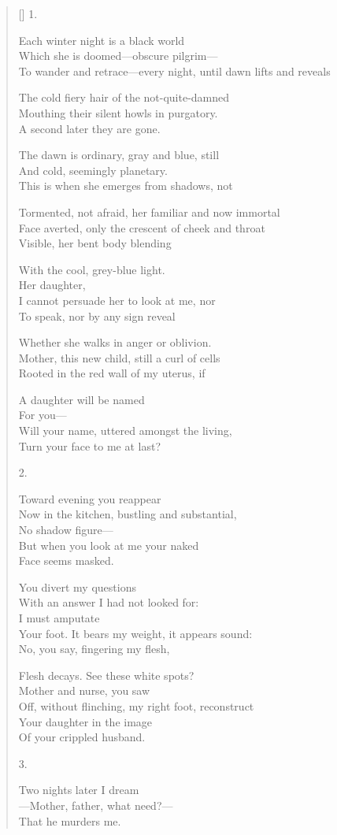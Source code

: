 \settowidth{\versewidth}{To wander and retrace---every night, until dawn lifts and reveals}
\begin{verse}[\versewidth]
1.

Each winter night is a black world\\
Which she is doomed---obscure pilgrim---\\
To wander and retrace---every night, until dawn lifts and reveals

The cold fiery hair of the not-quite-damned\\
Mouthing their silent howls in purgatory.\\
	A second later they are gone.

The dawn is ordinary, gray and blue, still\\
And cold, seemingly planetary.\\
This is when she emerges from shadows, not 

Tormented, not afraid, her familiar and now immortal\\
Face averted, only the crescent of cheek and throat\\
Visible, her bent body blending

With the cool, grey-blue light.\\
\hfill Her daughter,\\
I cannot persuade her to look at me, nor\\
To speak, nor by any sign reveal

Whether she walks in anger or oblivion.\\
Mother, this new child, still a curl of cells\\
Rooted in the red wall of my uterus, if

A daughter will be named\\
For you---\\
\hfill Will your name, uttered amongst the living,\\
Turn your face to me at last?

2.

Toward evening you reappear\\
Now in the kitchen, bustling and substantial,\\
No shadow figure---\\
But when you look at me your naked \\
Face seems masked.

You divert my questions\\
With an answer I had not looked for:\\
I must amputate \\
Your foot. It bears my weight, it appears sound:\\
No, you say, fingering my flesh,

Flesh decays. See these white spots?\\
Mother and nurse, you saw\\
Off, without flinching, my right foot, reconstruct\\
Your daughter in the image\\
Of your crippled husband.

3.

Two nights later I dream\\
---Mother, father, what need?---\\
That he murders me.
\end{verse}
